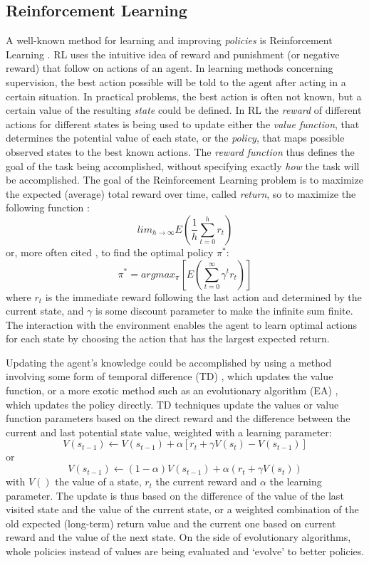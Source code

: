 \documentclass[11pt]{article}
\begin{document}
\subsection{Reinforcement Learning}
A well-known method for learning and improving \emph{policies} is Reinforcement Learning \cite[p.51-82]{sutton98}. RL uses the intuitive idea of reward and punishment (or negative reward) that follow on actions of an agent. In learning methods concerning supervision, the best action possible will be told to the agent after acting in a certain situation. In practical problems, the best action is often not known, but a certain value of the resulting \emph{state} could be defined. In RL the \emph{reward} of different actions for different states is being used to update either the \emph{value function}, that determines the potential value of each state, or the \emph{policy}, that maps possible observed states to the best known actions. The \emph{reward function} thus defines the goal of the task being accomplished, without specifying exactly \emph{how} the task will be accomplished. The goal of the Reinforcement Learning problem is to maximize the expected (average) total reward over time, called \emph{return}, so to maximize the following function \cite{kaebling96}:
 \[ lim_{h \rightarrow \infty} E( \frac1h \sum_{t=0}^h r_t ) \]
or, more often cited \cite{li-juan08}, to find the optimal policy $\pi^*$:
 \[ \pi^* = argmax_{\pi} [ E( \sum_{t=0}^{\infty} \gamma^{t} r_t ) ] \]
where $r_t$ is the immediate reward following the last action and determined by the current state, and $\gamma$ is some discount parameter to make the infinite sum finite. The interaction with the environment enables the agent to learn optimal actions for each state by choosing the action that has the largest expected return.

Updating the agent's knowledge could be accomplished by using a method involving some form of temporal difference (TD) \cite[p.133-157]{sutton98}, which updates the value function, or a more exotic method such as an evolutionary algorithm (EA) \cite{li-juan08}, which updates the policy directly. TD techniques update the values or value function parameters based on the direct reward and the difference between the current and last potential state value, weighted with a learning parameter:
 \[ V(s_{t-1}) \leftarrow V(s_{t-1}) + \alpha [ r_t + \gamma V(s_t) - V(s_{t-1}) ] \]
or
 \[ V(s_{t-1}) \leftarrow (1 - \alpha) V(s_{t-1}) + \alpha ( r_t + \gamma V(s_t) ) \]
with $V()$ the value of a state, $r_t$ the current reward and $\alpha$ the learning parameter. The update is thus based on the difference of the value of the last visited state and the value of the current state, or a weighted combination of the old expected (long-term) return value and the current one based on current reward and the value of the next state. On the side of evolutionary algorithms, whole policies instead of values are being evaluated and `evolve' to better policies.
\end{document}
